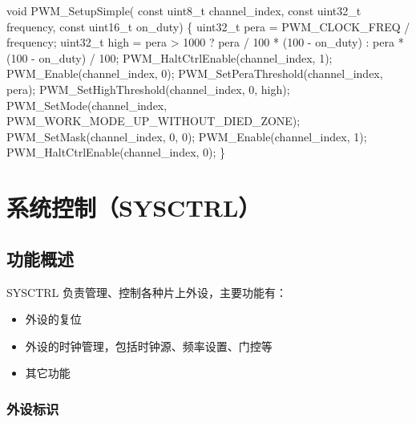 \documentclass[
  12pt,
]{book}
\newenvironment{Shaded}{\begin{snugshade}}{\end{snugshade}}
\newcommand{\DataTypeTok}[1]{\textcolor[rgb]{0.13,0.29,0.53}{#1}}
\newcommand{\DecValTok}[1]{\textcolor[rgb]{0.00,0.00,0.81}{#1}}
\newcommand{\NormalTok}[1]{#1}
\providecommand{\tightlist}{%
  \setlength{\itemsep}{0pt}\setlength{\parskip}{0pt}}
\begin{document}
\begin{Shaded}
\begin{Highlighting}[]
\DataTypeTok{void}\NormalTok{ PWM_SetupSimple(}
    \DataTypeTok{const} \DataTypeTok{uint8_t}\NormalTok{ channel_index,}
    \DataTypeTok{const} \DataTypeTok{uint32_t}\NormalTok{ frequency,}
    \DataTypeTok{const} \DataTypeTok{uint16_t}\NormalTok{ on_duty)}
\NormalTok{\{}
    \DataTypeTok{uint32_t}\NormalTok{ pera = PWM_CLOCK_FREQ / frequency;}
    \DataTypeTok{uint32_t}\NormalTok{ high = pera > }\DecValTok{1000}\NormalTok{ ?}
\NormalTok{          pera / }\DecValTok{100}\NormalTok{ * (}\DecValTok{100}\NormalTok{ - on_duty)}
\NormalTok{        : pera * (}\DecValTok{100}\NormalTok{ - on_duty) / }\DecValTok{100}\NormalTok{;}
\NormalTok{    PWM_HaltCtrlEnable(channel_index, }\DecValTok{1}\NormalTok{);}
\NormalTok{    PWM_Enable(channel_index, }\DecValTok{0}\NormalTok{);}
\NormalTok{    PWM_SetPeraThreshold(channel_index, pera);}
\NormalTok{    PWM_SetHighThreshold(channel_index, }\DecValTok{0}\NormalTok{, high);}
\NormalTok{    PWM_SetMode(channel_index, PWM_WORK_MODE_UP_WITHOUT_DIED_ZONE);}
\NormalTok{    PWM_SetMask(channel_index, }\DecValTok{0}\NormalTok{, }\DecValTok{0}\NormalTok{);}
\NormalTok{    PWM_Enable(channel_index, }\DecValTok{1}\NormalTok{);}
\NormalTok{    PWM_HaltCtrlEnable(channel_index, }\DecValTok{0}\NormalTok{);}
\NormalTok{\}}
\end{Highlighting}
\end{Shaded}

\hypertarget{ch-sysctrl}{%
\chapter{系统控制（SYSCTRL）}\label{ch-sysctrl}}

\hypertarget{ux529fux80fdux6982ux8ff0-2}{%
\section{功能概述}\label{ux529fux80fdux6982ux8ff0-2}}

SYSCTRL 负责管理、控制各种片上外设，主要功能有：

\begin{itemize}
\tightlist
\item
  外设的复位
\item
  外设的时钟管理，包括时钟源、频率设置、门控等
\item
  其它功能
\end{itemize}

\hypertarget{ux5916ux8bbeux6807ux8bc6}{%
\subsection{外设标识}\label{ux5916ux8bbeux6807ux8bc6}}
\end{document}
